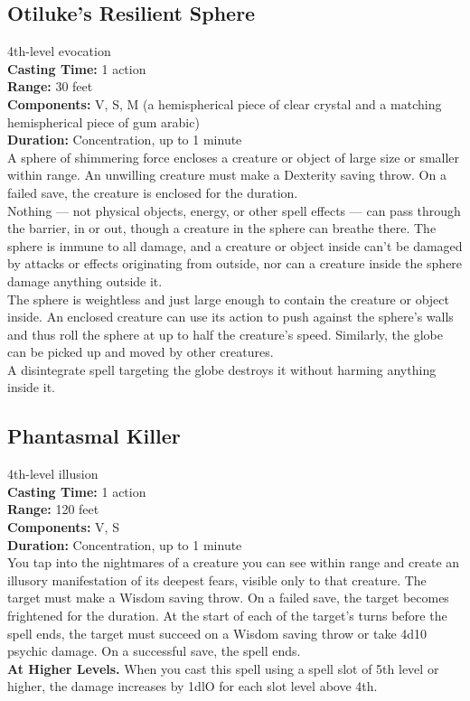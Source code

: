 \documentclass[11pt, A4paper, english]{article}
\begin{document}
		\subsection{Otiluke’s Resilient Sphere}
4th-level evocation \\
\textbf{Casting Time:} 1 action \\
\textbf{Range:} 30 feet \\
\textbf{Components:} V, S, M (a hemispherical piece of clear crystal and a matching hemispherical piece of gum arabic) \\
\textbf{Duration:} Concentration, up to 1 minute \\
A sphere of shimmering force encloses a creature or object of large size or smaller within range. An unwilling creature must make a Dexterity saving throw. On a failed save, the creature is enclosed for the duration. \\
Nothing — not physical objects, energy, or other spell effects — can pass through the barrier, in or out, though a creature in the sphere can breathe there. The sphere is immune to all damage, and a creature or object inside can’t be damaged by attacks or effects originating from outside, nor can a creature inside the sphere damage anything outside it. \\
The sphere is weightless and just large enough to contain the creature or object inside. An enclosed creature can use its action to push against the sphere’s walls and thus roll the sphere at up to half the creature’s speed. Similarly, the globe can be picked up and moved by other creatures. \\
A disintegrate spell targeting the globe destroys it without harming anything inside it.

		\subsection{Phantasmal Killer}
4th-level illusion \\
\textbf{Casting Time:} 1 action \\
\textbf{Range:} 120 feet \\
\textbf{Components:} V, S \\
\textbf{Duration:} Concentration, up to 1 minute \\
You tap into the nightmares of a creature you can see within range and create an illusory manifestation of its deepest fears, visible only to that creature. The target must make a Wisdom saving throw. On a failed save, the target becomes frightened for the duration. At the start of each of the target’s turns before the spell ends, the target must succeed on a Wisdom saving throw or take 4d10 psychic damage. On a successful save, the spell ends. \\
\textbf{At Higher Levels.} When you cast this spell using a spell slot of 5th level or higher, the damage increases by 1dlO for each slot level above 4th.
\end{document}
